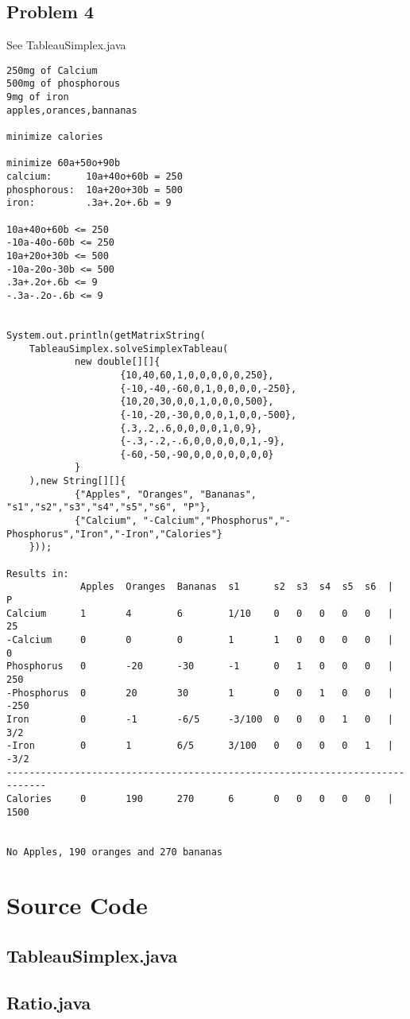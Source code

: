 \documentclass[11pt,a4paper,openany]{report}
\begin{document}
\subsection{Problem 4}
See TableauSimplex.java
\begin{verbatim}
250mg of Calcium
500mg of phosphorous
9mg of iron
apples,orances,bannanas

minimize calories

minimize 60a+50o+90b
calcium:      10a+40o+60b = 250
phosphorous:  10a+20o+30b = 500
iron:         .3a+.2o+.6b = 9

10a+40o+60b <= 250
-10a-40o-60b <= 250
10a+20o+30b <= 500
-10a-20o-30b <= 500
.3a+.2o+.6b <= 9
-.3a-.2o-.6b <= 9


System.out.println(getMatrixString(
    TableauSimplex.solveSimplexTableau(
            new double[][]{
                    {10,40,60,1,0,0,0,0,0,250},
                    {-10,-40,-60,0,1,0,0,0,0,-250},
                    {10,20,30,0,0,1,0,0,0,500},
                    {-10,-20,-30,0,0,0,1,0,0,-500},
                    {.3,.2,.6,0,0,0,0,1,0,9},
                    {-.3,-.2,-.6,0,0,0,0,0,1,-9},
                    {-60,-50,-90,0,0,0,0,0,0,0}
            }
    ),new String[][]{
            {"Apples", "Oranges", "Bananas", "s1","s2","s3","s4","s5","s6", "P"},
            {"Calcium", "-Calcium","Phosphorus","-Phosphorus","Iron","-Iron","Calories"}
    }));

Results in:
             Apples  Oranges  Bananas  s1      s2  s3  s4  s5  s6  |  P
Calcium      1       4        6        1/10    0   0   0   0   0   |  25
-Calcium     0       0        0        1       1   0   0   0   0   |  0
Phosphorus   0       -20      -30      -1      0   1   0   0   0   |  250
-Phosphorus  0       20       30       1       0   0   1   0   0   |  -250
Iron         0       -1       -6/5     -3/100  0   0   0   1   0   |  3/2
-Iron        0       1        6/5      3/100   0   0   0   0   1   |  -3/2
-----------------------------------------------------------------------------
Calories     0       190      270      6       0   0   0   0   0   |  1500


No Apples, 190 oranges and 270 bananas

\end{verbatim}

\newpage
\section{Source Code}
\subsection{TableauSimplex.java}

\newpage
\subsection{Ratio.java}

\end{document}
